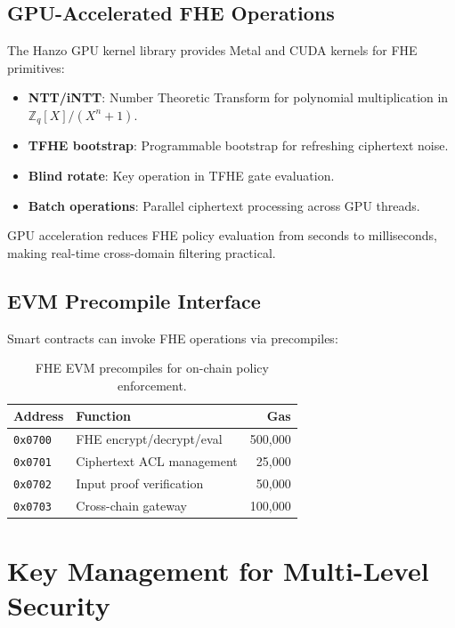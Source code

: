 \documentclass[11pt,letterpaper]{article}
\begin{document}
\subsection{GPU-Accelerated FHE Operations}

The Hanzo GPU kernel library provides Metal and CUDA kernels for FHE primitives:

\begin{itemize}
\item \textbf{NTT/iNTT}: Number Theoretic Transform for polynomial multiplication in $\mathbb{Z}_q[X]/(X^n+1)$.
\item \textbf{TFHE bootstrap}: Programmable bootstrap for refreshing ciphertext noise.
\item \textbf{Blind rotate}: Key operation in TFHE gate evaluation.
\item \textbf{Batch operations}: Parallel ciphertext processing across GPU threads.
\end{itemize}

GPU acceleration reduces FHE policy evaluation from seconds to milliseconds, making real-time cross-domain filtering practical.

\subsection{EVM Precompile Interface}

Smart contracts can invoke FHE operations via precompiles:

\begin{table}[H]
\centering
\begin{tabular}{@{}llr@{}}
\toprule
\textbf{Address} & \textbf{Function} & \textbf{Gas} \\
\midrule
\texttt{0x0700} & FHE encrypt/decrypt/eval & 500,000 \\
\texttt{0x0701} & Ciphertext ACL management & 25,000 \\
\texttt{0x0702} & Input proof verification & 50,000 \\
\texttt{0x0703} & Cross-chain gateway & 100,000 \\
\bottomrule
\end{tabular}
\caption{FHE EVM precompiles for on-chain policy enforcement.}
\label{tab:fhe-precompiles}
\end{table}

\section{Key Management for Multi-Level Security}
\end{document}
